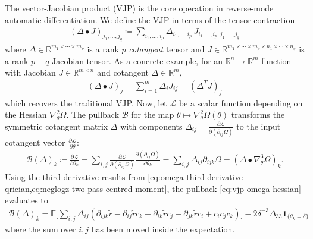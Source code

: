 \documentclass{article}
\begin{document}
The vector-Jacobian product (VJP) is the core operation in reverse-mode automatic differentiation.
We define the VJP in terms of the tensor contraction
%
\begin{align}\label{eq:general-bullet-contraction}
  (\Delta \bullet J)_{j_1, \ldots, j_q} \coloneqq \sum_{i_1, \ldots, i_p} \Delta_{i_1, \ldots, i_p} \, J_{i_1, \ldots, i_p, j_1, \ldots, j_q}
\end{align}
%
where $\Delta \in \mathbb{R}^{m_1 \times \cdots \times m_p}$ is a rank $p$ \textit{cotangent} tensor and $J \in \mathbb{R}^{m_1 \times \cdots \times m_p \times n_1 \times \cdots \times n_q}$ is a rank $p+q$ Jacobian tensor.
As a concrete example, for an $\mathbb{R}^n \to \mathbb{R}^m$ function with Jacobian $J \in \mathbb{R}^{m \times n}$ and cotangent $\Delta \in \mathbb{R}^m$,
%
\begin{align}
  (\Delta \bullet J)_j = \sum_{i=1}^m \Delta_i J_{i j} = (\Delta^{T} J)_j
\end{align}
%
which recovers the traditional VJP.
Now, let $\mathcal{L}$ be a scalar function depending on the Hessian $\nabla_\theta^2 \Omega$.
The pullback $\mathcal{B}$ for the map $\theta \mapsto \nabla_\theta^2 \Omega(\theta)$ transforms the symmetric cotangent matrix $\Delta$ with components $\Delta_{ij} = \frac{\partial \mathcal{L}}{\partial (\partial_{ij} \Omega)}$ to the input cotangent vector $\frac{\partial \mathcal{L}}{\partial \theta}$:
%
\begin{align}
  \mathcal{B}(\Delta)_k \coloneqq \frac{\partial \mathcal{L}}{\partial \theta_k} = \sum_{i,j} \frac{\partial \mathcal{L}}{\partial (\partial_{ij} \Omega)} \frac{\partial (\partial_{ij} \Omega)}{\partial \theta_k} = \sum_{i,j} \Delta_{ij} \partial_{ijk} \Omega = (\Delta \bullet \nabla_\theta^3 \Omega)_k. \label{eq:vjp-omega-hessian}
\end{align}
%
Using the third-derivative results from \cref{eq:omega-third-derivative-qrician,eq:neglogz-two-pass-centred-moment}, the pullback \cref{eq:vjp-omega-hessian} evaluates to
%
\begin{align}
  \mathcal{B}(\Delta)_k = \mathbb{E} \bigg[ \sum_{i,j} \Delta_{ij} (\partial_{ijk} \tilde{r} - \partial_{ij} \tilde{r} c_k - \partial_{ik} \tilde{r} c_j - \partial_{jk} \tilde{r} c_i + c_i c_j c_k) \bigg] - 2 \delta^{-3} \Delta_{33} \mathbf{1}_{\{\theta_k=\delta\}}
\end{align}
%
where the sum over $i,j$ has been moved inside the expectation.
\end{document}
